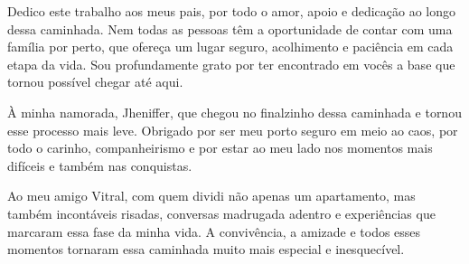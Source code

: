 
\begin{epigrafe}[Dedicatória]

	Dedico este trabalho aos meus pais, por todo o amor, apoio e dedicação ao longo dessa caminhada. Nem todas as pessoas têm a oportunidade de contar com uma família por perto, que ofereça um lugar seguro, acolhimento e paciência em cada etapa da vida. Sou profundamente grato por ter encontrado em vocês a base que tornou possível chegar até aqui.

À minha namorada, Jheniffer, que chegou no finalzinho dessa caminhada e tornou esse processo mais leve. Obrigado por ser meu porto seguro em meio ao caos, por todo o carinho, companheirismo e por estar ao meu lado nos momentos mais difíceis e também nas conquistas.

Ao meu amigo Vitral, com quem dividi não apenas um apartamento, mas também incontáveis risadas, conversas madrugada adentro e experiências que marcaram essa fase da minha vida. A convivência, a amizade e todos esses momentos tornaram essa caminhada muito mais especial e inesquecível.

\end{epigrafe}